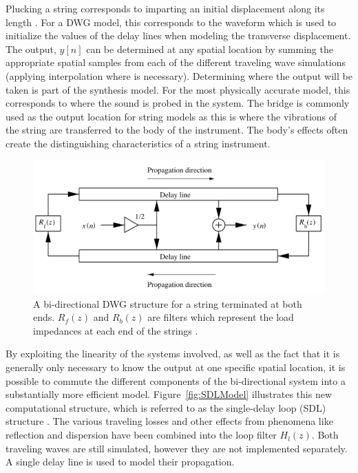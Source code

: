 \documentclass[main.tex]{subfiles}
\begin{document}
Plucking a string corresponds to imparting an initial displacement along its length . For a DWG model, this corresponds to the waveform which is used to initialize the values of the delay lines when modeling the transverse displacement. The output, $y[n]$ can be determined at any spatial location by summing the appropriate spatial samples from each of the different traveling wave simulations (applying interpolation where is necessary). Determining where the output will be taken is part of the synthesis model. For the most physically accurate model, this corresponds to where the sound is probed in the system. The bridge is commonly used as the output location for string models as this is where the vibrations of the string are transferred to the body of the instrument. The body's effects often create the distinguishing characteristics of a string instrument.

\begin{figure}[h]
    \centering
    \includegraphics[scale=.85]{./images/diagrams/BiDirectionalDWG1.png}
    \caption{A bi-directional DWG structure for a string terminated at both ends. $R_f(z)$ and $R_b(z)$ are filters which represent the load impedances at each end of the strings .}
    \label{fig:BiDirectionDWG}
\end{figure}

By exploiting the linearity of the systems involved, as well as the fact that it is generally only necessary to know the output at one specific spatial location, it is possible to commute the different components of the bi-directional system into a substantially more efficient model. Figure~\ref{fig:SDLModel} illustrates this new computational structure, which is referred to as the single-delay loop (SDL) structure . The various traveling losses and other effects from phenomena like reflection and dispersion have been combined into the loop filter $H_l(z)$. Both traveling waves are still simulated, however they are not implemented separately. A single delay line is used to model their propagation.
\end{document}
